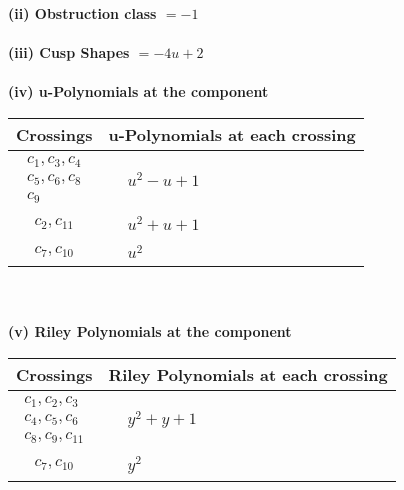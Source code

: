 \documentclass[1p]{elsarticle_modified}
\theoremstyle{definition}
\begin{document}
\flushleft \textbf{(ii) Obstruction class $= -1$}\\~\\
\flushleft \textbf{(iii) Cusp Shapes $= -4 u+2$}\\~\\
\newpage\renewcommand{\arraystretch}{1}
\flushleft \textbf{(iv) u-Polynomials at the component}\newline \\
\begin{tabular}{m{50pt}|m{274pt}}
Crossings & \hspace{64pt}u-Polynomials at each crossing \\
\hline $$\begin{aligned}c_{1},c_{3},c_{4}\\c_{5},c_{6},c_{8}\\c_{9}\end{aligned}$$&$\begin{aligned}
&u^2- u+1
\end{aligned}$\\
\hline $$\begin{aligned}c_{2},c_{11}\end{aligned}$$&$\begin{aligned}
&u^2+u+1
\end{aligned}$\\
\hline $$\begin{aligned}c_{7},c_{10}\end{aligned}$$&$\begin{aligned}
&u^2
\end{aligned}$\\
\hline
\end{tabular}\\~\\
\newpage\renewcommand{\arraystretch}{1}
\flushleft \textbf{(v) Riley Polynomials at the component}\newline \\
\begin{tabular}{m{50pt}|m{274pt}}
Crossings & \hspace{64pt}Riley Polynomials at each crossing \\
\hline $$\begin{aligned}c_{1},c_{2},c_{3}\\c_{4},c_{5},c_{6}\\c_{8},c_{9},c_{11}\end{aligned}$$&$\begin{aligned}
&y^2+y+1
\end{aligned}$\\
\hline $$\begin{aligned}c_{7},c_{10}\end{aligned}$$&$\begin{aligned}
&y^2
\end{aligned}$\\
\hline
\end{tabular}\\~\\
\end{document}
